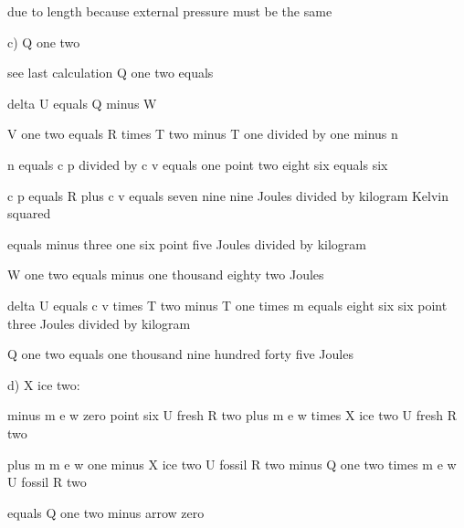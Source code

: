 due to length because external pressure must be the same

c) Q one two

see last calculation Q one two equals

delta U equals Q minus W

V one two equals R times T two minus T one divided by one minus n

n equals c p divided by c v equals one point two eight six equals six

c p equals R plus c v equals seven nine nine Joules divided by kilogram Kelvin squared

equals minus three one six point five Joules divided by kilogram

W one two equals minus one thousand eighty two Joules

delta U equals c v times T two minus T one times m equals eight six six point three Joules divided by kilogram

Q one two equals one thousand nine hundred forty five Joules

d) X ice two:

minus m e w zero point six U fresh R two plus m e w times X ice two U fresh R two

plus m m e w one minus X ice two U fossil R two minus Q one two times m e w U fossil R two

equals Q one two minus arrow zero